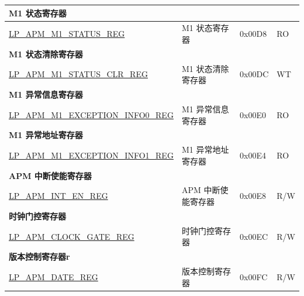 \begin{longtable}{ | p{6cm} | p{6.2cm} | p{2.2cm} | p{1cm} | }
\multicolumn{4}{|l|}{\textbf{M1 状态寄存器}} \\ \hline
\hyperref[regdesc:LPAPMM1STATUSREG]{LP\_APM\_M1\_STATUS\_REG} & M1 状态寄存器 & 0x00D8 & RO \\ \hline
\multicolumn{4}{|l|}{\textbf{M1 状态清除寄存器}} \\ \hline
\hyperref[regdesc:LPAPMM1STATUSCLRREG]{LP\_APM\_M1\_STATUS\_CLR\_REG} & M1 状态清除寄存器 & 0x00DC & WT \\ \hline
\multicolumn{4}{|l|}{\textbf{M1 异常信息寄存器}} \\ \hline
\hyperref[regdesc:LPAPMM1EXCEPTIONINFO0REG]{LP\_APM\_M1\_EXCEPTION\_INFO0\_REG} & M1 异常信息寄存器 & 0x00E0 & RO \\ \hline
\multicolumn{4}{|l|}{\textbf{M1 异常地址寄存器}} \\ \hline
\hyperref[regdesc:LPAPMM1EXCEPTIONINFO1REG]{LP\_APM\_M1\_EXCEPTION\_INFO1\_REG} & M1 异常地址寄存器 & 0x00E4 & RO \\ \hline
\multicolumn{4}{|l|}{\textbf{APM 中断使能寄存器}} \\ \hline
\hyperref[regdesc:LPAPMINTENREG]{LP\_APM\_INT\_EN\_REG} & APM 中断使能寄存器 & 0x00E8 & R/W \\ \hline
\multicolumn{4}{|l|}{\textbf{时钟门控寄存器}} \\ \hline
\hyperref[regdesc:LPAPMCLOCKGATEREG]{LP\_APM\_CLOCK\_GATE\_REG} & 时钟门控寄存器 & 0x00EC & R/W \\ \hline
\multicolumn{4}{|l|}{\textbf{版本控制寄存器r}} \\ \hline
\hyperref[regdesc:LPAPMDATEREG]{LP\_APM\_DATE\_REG} & 版本控制寄存器 & 0x00FC & R/W \\ \hline
\end{longtable}
